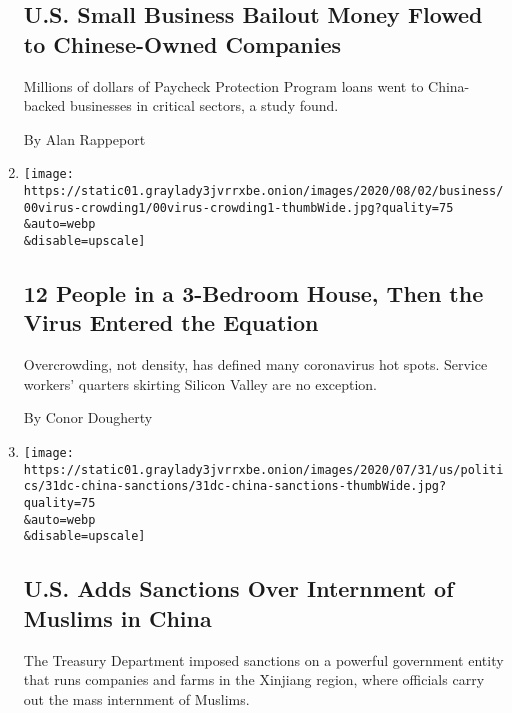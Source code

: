 \begin{enumerate}
{  \subsection{U.S. Small Business Bailout Money Flowed to Chinese-Owned
  Companies}\label{us-small-business-bailout-money-flowed-to-chinese-owned-companies}}

  Millions of dollars of Paycheck Protection Program loans went to
  China-backed businesses in critical sectors, a study found.

  By Alan Rappeport
\item
  \href{/2020/08/01/business/economy/housing-overcrowding-coronavirus.html}{}

  \texttt{[image: https://static01.graylady3jvrrxbe.onion/images/2020/08/02/business/00virus-crowding1/00virus-crowding1-thumbWide.jpg?quality=75\\\&auto=webp\\\&disable=upscale]}

  \hypertarget{12-people-in-a-3-bedroom-house-then-the-virus-entered-the-equation}{%
  \subsection{12 People in a 3-Bedroom House, Then the Virus Entered the
  Equation}\label{12-people-in-a-3-bedroom-house-then-the-virus-entered-the-equation}}

  Overcrowding, not density, has defined many coronavirus hot spots.
  Service workers' quarters skirting Silicon Valley are no exception.

  By Conor Dougherty
\item
  \href{/2020/07/31/us/politics/sanctions-china-xinjiang-uighurs.html}{}

  \texttt{[image: https://static01.graylady3jvrrxbe.onion/images/2020/07/31/us/politics/31dc-china-sanctions/31dc-china-sanctions-thumbWide.jpg?quality=75\\\&auto=webp\\\&disable=upscale]}

  \hypertarget{us-adds-sanctions-over-internment-of-muslims-in-china}{%
  \subsection{U.S. Adds Sanctions Over Internment of Muslims in
  China}\label{us-adds-sanctions-over-internment-of-muslims-in-china}}

  The Treasury Department imposed sanctions on a powerful government
  entity that runs companies and farms in the Xinjiang region, where
  officials carry out the mass internment of Muslims.


\end{enumerate}
